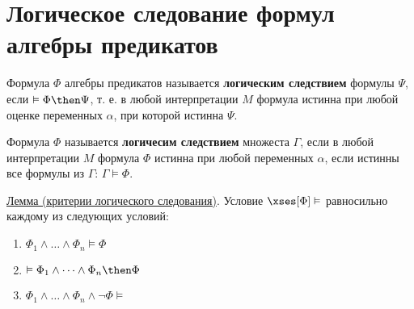 \section{Логическое следование формул алгебры предикатов}
\dftion Формула $\Phi$ алгебры предикатов называется \textbf{логическим следствием} формулы $\Psi$, если $\vDash \Phi \then \Psi$, т. е. в любой интерпретации $M$ формула истинна при любой оценке переменных $\alpha$, при которой истинна $\Psi$.

\dftion Формула $\Phi$ называется \textbf{логичесим следствием} множеста $\Gamma$, если в любой интерпретации $M$ формула $\Phi$ истинна при любой переменных $\alpha$, если истинны все формулы из $\Gamma$: $\Gamma \vDash \Phi$.

\underline{Лемма (критерии логического следования)}. Условие $\xses[\Phi] \vDash$ равносильно каждому из следующих условий:
\begin{enumerate}
    \item $\Phi_1 \land \dots \land \Phi_n \vDash \Phi$
    \item $\vDash \Phi_1 \land \dots \land \Phi_n \then \Phi$
    \item $\Phi_1 \land \dots \land \Phi_n \land \lnot \Phi \vDash$
\end{enumerate}